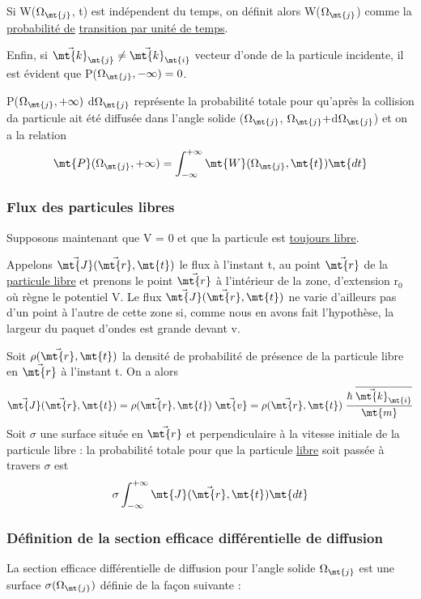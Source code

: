 Si W($\Omega_\mt{j}$, t) est indépendent du temps, on définit alors W($\Omega_\mt{j}$)
comme la \ul{probabilité de} \ul{transition par unité de temps}.

Enfin, si $\vec{\mt{k}}_\mt{j}\neq\vec{\mt{k}}_\mt{i}$ vecteur d'onde de la particule incidente, il
est évident que P($\Omega_\mt{j},-\infty)=0$.

P($\Omega_\mt{j},+\infty)$ d$\Omega_\mt{j}$ représente la probabilité totale pour qu'après
la collision da particule ait été diffusée dans l'angle solide
($\Omega_\mt{j}$, $\Omega_\mt{j}+$d$\Omega_\mt{j}$) et on a la relation
\[
\mt{P}(\Omega_\mt{j},+\infty)=\int_{-\infty}^{+\infty}\mt{W}(\Omega_\mt{j},\mt{t})\mt{ dt}
\]
\subsubsection{Flux des particules libres}%
Supposons maintenant que V = 0 et que la particule est
\ul{toujours libre}.

Appelons $\vec{\mt{J}}(\vec{\mt{r}},\mt{t})$ le flux à l'instant t, au point $\vec{\mt{r}}$ de la
\ul{particule libre} et prenons le point $\vec{\mt{r}}$ à l'intérieur de la zone, d'extension r$_0$
où règne le potentiel V. Le flux $\vec{\mt{J}}(\vec{\mt{r}},\mt{t})$ ne varie d'ailleurs pas
d'un point à l'autre de cette zone si, comme nous en avons fait l'hypothèse,
la largeur du paquet d'ondes est grande devant v.

Soit $\rho(\vec{\mt{r}},\mt{t})$ la densité de probabilité de présence de la
particule libre en $\vec{\mt{r}}$ à l'instant t. On a alors
\[
\vec{\mt{J}}(\vec{\mt{r}},\mt{t})=\rho(\vec{\mt{r}},\mt{t})\;\vec{\mt{v}}=
\rho(\vec{\mt{r}},\mt{t})\;\frac{\hbar\;\overline{\vec{\mt{k}}_\mt{i}}}{\mt{m}}
\]
Soit $\sigma$ une surface située en $\vec{\mt{r}}$ et perpendiculaire à la vitesse initiale
de la particule libre : la probabilité totale pour que la particule
\ul{libre} soit passée à travers $\sigma$ est
\[
\sigma\int_{-\infty}^{+\infty}\mt{J}(\vec{\mt{r}},\mt{t})\mt{ dt}
\]

\subsubsection{Définition de la section efficace différentielle de diffusion}%

La section efficace différentielle de diffusion pour
l'angle solide $\Omega_\mt{j}$ est une surface $\sigma(\Omega_\mt{j})$ définie de la façon suivante :

